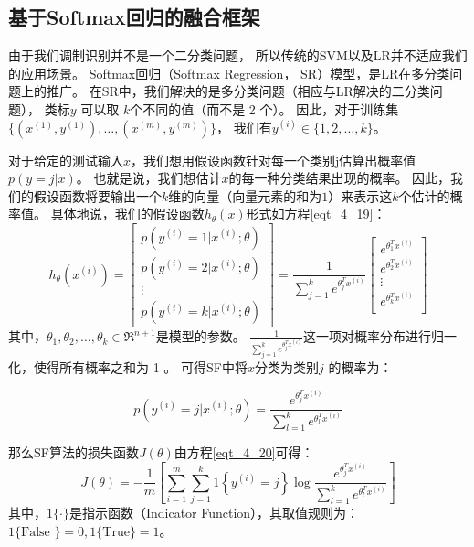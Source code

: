 \subsection{基于Softmax回归的融合框架}

由于我们调制识别并不是一个二分类问题，
所以传统的SVM以及LR并不适应我们的应用场景。
Softmax回归（Softmax Regression， SR）模型，是LR在多分类问题上的推广。
在SR中，我们解决的是多分类问题（相应与LR解决的二分类问题），
类标$y$ 可以取 $k$个不同的值（而不是 2 个）。
因此，对于训练集 $\{ (x^{(1)}, y^{(1)}), \dots, (x^{(m)}, y^{(m)}) \}$，
我们有$y^{(i)} \in \{1, 2, \dots, k\}$。\par

对于给定的测试输入$x$，我们想用假设函数针对每一个类别j估算出概率值$p(y=j | x)$。
也就是说，我们想估计$x$的每一种分类结果出现的概率。
因此，我们的假设函数将要输出一个$k$维的向量（向量元素的和为$1$）来表示这$k$个估计的概率值。
具体地说，我们的假设函数$h_{\theta}(x)$形式如方程\eqref{eqt_4_19}：
\begin{equation}
\label{eqt_4_19}
		h_\theta(x^{(i)}) =
		\begin{bmatrix}
			p(y^{(i)} = 1 | x^{(i)}; \theta) \\
			p(y^{(i)} = 2 | x^{(i)}; \theta) \\
			\vdots \\
			p(y^{(i)} = k | x^{(i)}; \theta)
		\end{bmatrix}
			=
			\frac{1}{ \sum_{j=1}^{k}{e^{ \theta_j^T x^{(i)} }} }
			\begin{bmatrix}
			e^{ \theta_1^T x^{(i)} } \\
			e^{ \theta_2^T x^{(i)} } \\
			\vdots \\
			e^{ \theta_k^T x^{(i)} } \\
			\end{bmatrix}
\end{equation}
其中，$\theta_1, \theta_2, \ldots, \theta_k \in \Re^{n+1}$是模型的参数。
$\frac{1}{ \sum_{j=1}^{k}{e^{ \theta_j^T x^{(i)} }} }$这一项对概率分布进行归一化，使得所有概率之和为 1 。
可得SF中将$x$分类为类别$j$ 的概率为：\par
\begin{equation}
p(y^{(i)} = j | x^{(i)} ; \theta) = \frac{e^{\theta_j^T x^{(i)}}}{\sum_{l=1}^k e^{ \theta_l^T x^{(i)}} }
\end{equation}

那么SF算法的损失函数$J(\theta)$由方程\eqref{eqt_4_20}可得：
\begin{equation}
	\label{eqt_4_20}
	J(\theta) = - \frac{1}{m} \left[ \sum_{i=1}^{m} \sum_{j=1}^{k}  1\left\{y^{(i)} = j\right\} \log \frac{e^{\theta_j^T x^{(i)}}}{\sum_{l=1}^k e^{ \theta_l^T x^{(i)} }}\right]
\end{equation}
其中，$1\{\cdot\}$是指示函数（Indicator Function），其取值规则为：$1\{ \text{False }\}=0, 1\{ \text{True} \}=1$。\par

